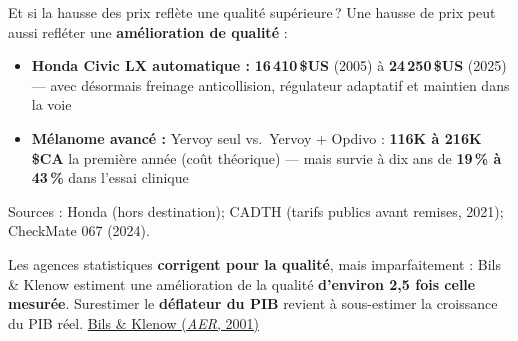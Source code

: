 \documentclass[aspectratio=169]{beamer}
\begin{document}
\begin{frame}[t]{Et si la hausse des prix reflète une qualité supérieure\,?}
   \small
   Une hausse de prix peut aussi refléter une \textbf{amélioration de qualité} :
   \vspace{0.15cm}
   \begin{itemize}
      \setlength\itemsep{0.15cm}
      \item \textbf{Honda Civic LX automatique :} \textbf{16\,410\,\$US} (2005) à \textbf{24\,250\,\$US} (2025) --- avec désormais freinage anticollision, régulateur adaptatif et maintien dans la voie
      \item \textbf{Mélanome avancé :} Yervoy seul vs.\ Yervoy + Opdivo : \textbf{116K à 216K\,\$CA} la première année (coût théorique) --- mais survie à dix ans de \textbf{19\,\% à 43\,\%} dans l'essai clinique
   \end{itemize}
   {\scriptsize\color{HECgray} Sources : Honda (hors destination); CADTH (tarifs publics avant remises, 2021); CheckMate 067 (2024).\par}
   \vspace{0.1cm}
   \begin{keyinsight}
      Les agences statistiques \textbf{corrigent pour la qualité}, mais imparfaitement : Bils \& Klenow estiment une amélioration de la qualité \textbf{d'environ 2,5 fois celle mesurée}. Surestimer le \textbf{déflateur du PIB} revient à sous-estimer la croissance du PIB réel.
      \mbox{}\hfill{\scriptsize\textcolor{HECgray}{\href{https://www.aeaweb.org/articles?id=10.1257/aer.91.4.1006}{Bils \& Klenow (\textit{AER}, 2001)}}}
   \end{keyinsight}
\end{frame}
\end{document}
